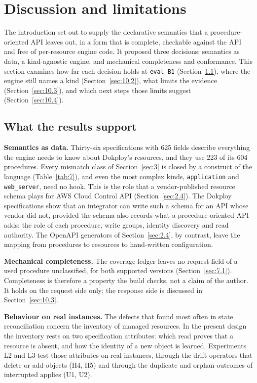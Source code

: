\section{Discussion and limitations}\label{sec:10}

The introduction set out to supply the declarative semantics that a procedure-oriented API leaves out,
in a form that is complete, checkable against the API and free of per-resource engine code. It
proposed three decisions: semantics as data, a kind-agnostic engine, and mechanical completeness and
conformance. This section examines how far each decision holds at \texttt{eval-B1} (Section~\ref{sec:10.1}), where the
engine still names a kind (Section~\ref{sec:10.2}), what limits the evidence (Section~\ref{sec:10.3}), and which next steps
those limits suggest (Section~\ref{sec:10.4}).

\subsection{What the results support}\label{sec:10.1}

\textbf{Semantics as data.} Thirty-six specifications with 625 fields describe everything the engine needs
to know about Dokploy's resources, and they use 223 of its 604 procedures. Every mismatch class of
Section~\ref{sec:3} is closed by a construct of the language (Table~\ref{tab:7}), and even the most complex kinds,
\texttt{application} and \texttt{web\_server}, need no hook. This is the role that a vendor-published resource schema
plays for AWS Cloud Control API (Section~\ref{sec:2.4}). The Dokploy specifications show that an integrator can
write such a schema for an API whose vendor did not, provided the schema also records what a
procedure-oriented API adds: the role of each procedure, write groups, identity discovery and read
authority. The OpenAPI generators of Section~\ref{sec:2.4}, by contrast, leave the mapping from procedures to
resources to hand-written configuration.

\textbf{Mechanical completeness.} The coverage ledger leaves no request field of a used procedure
unclassified, for both supported versions (Section~\ref{sec:7.1}). Completeness is therefore a property the
build checks, not a claim of the author. It holds on the request side only; the response side is
discussed in Section~\ref{sec:10.3}.

\textbf{Behaviour on real instances.}  The defects that \citet{hassan2024} found most often in
state reconciliation concern the inventory of managed resources. In the present design the inventory
rests on two specification attributes: which read proves that a resource is absent, and how the
identity of a new object is learned. Experiments L2 and L3 test those attributes on real instances,
through the drift operators that delete or add objects (H4, H5) and through the duplicate and orphan
outcomes of interrupted applies (U1, U2). 

